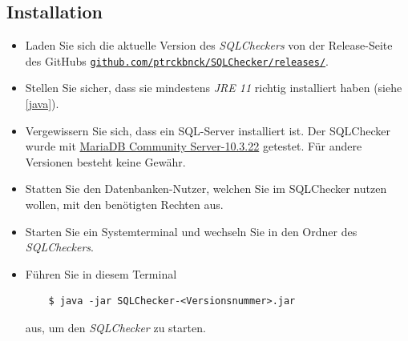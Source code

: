 \documentclass[11pt]{article}
\begin{document}
\subsection{Installation}
\begin{itemize}
	\item Laden Sie sich die aktuelle Version des \textit{SQLCheckers} von der Release-Seite des GitHubs \href{https://github.com/ptrckbnck/SQLChecker/releases/}{\texttt{github.com/ptrckbnck/SQLChecker/releases/}}.
	\item Stellen Sie sicher, dass sie mindestens \textit{JRE 11} richtig installiert haben (siehe \ref{java}).
	\item Vergewissern Sie sich, dass ein SQL-Server installiert ist. Der SQLChecker wurde mit \href{https://mariadb.com/downloads/}{MariaDB Community Server-10.3.22} getestet. Für andere Versionen besteht keine Gewähr.
	\item Statten Sie den Datenbanken-Nutzer, welchen Sie im SQLChecker nutzen wollen, mit den benötigten Rechten aus.
	\item Starten Sie ein Systemterminal und wechseln Sie in den Ordner des \textit{SQLCheckers}.
	\item Führen Sie in diesem Terminal
	\begin{verbatim}
	$ java -jar SQLChecker-<Versionsnummer>.jar
	\end{verbatim}
	 aus, um den \textit{SQLChecker} zu starten.
\end{itemize}
\end{document}

